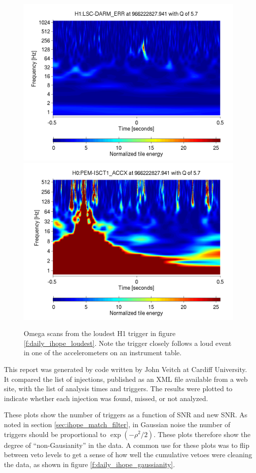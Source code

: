 \begin{figure}
  \includegraphics[width=0.5\linewidth]{figures/detchar/966222827_940673828_H1_LSC-DARM_ERR_1_00_spectrogram_whitened.png}
  \includegraphics[width=0.5\linewidth]{figures/detchar/966222827_940673828_H0_PEM-ISCT1_ACCX_1_00_spectrogram_whitened.png}
  \caption[Omega scans from the loudest H1 trigger in figure \ref{f:daily_ihope_loudest}]{
  \label{f:daily_ihope_loudest_omega}
Omega scans from the loudest H1 trigger in figure
\ref{f:daily_ihope_loudest}.
Note the trigger closely follows a loud
event in one of the accelerometers on an instrument table.}
\end{figure}%



This report was generated by code written by John Veitch  at Cardiff
University.  It compared the list of injections, published as an XML
file available from a web site, with the list of analysis times and
triggers.  The results were plotted to indicate whether each injection
was found, missed, or not analyzed.



These plots show the number of triggers as a function of SNR and new
SNR.  As noted in section \ref{sec:ihope_match_filter}, in Gaussian
noise the number of triggers should be proportional to
$\exp(-\rho^2/2)$.  These plots therefore show the degree of
``non-Gausianity'' in the data.  A common use for these plots was to
flip between veto levels to get a sense of how well the cumulative
vetoes were cleaning the data, as shown in figure
\ref{f:daily_ihope_gaussianity}.

